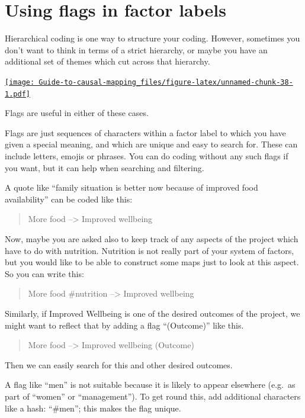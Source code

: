 \documentclass[
]{book}
\begin{document}
\hypertarget{using-flags-in-factor-labels}{%
\section{Using flags in factor labels}\label{using-flags-in-factor-labels}}

Hierarchical coding is one way to structure your coding. However, sometimes you don't want to think in terms of a strict hierarchy, or maybe you have an additional set of themes which cut across that hierarchy.

\href{https://player.vimeo.com/video/671894620}{\texttt{[image: Guide-to-causal-mapping\_files/figure-latex/unnamed-chunk-38-1.pdf]}}

Flags are useful in either of these cases.

Flags are just sequences of characters within a factor label to which you have given a special meaning, and which are unique and easy to search for. These can include letters, emojis or phrases. You can do coding without any such flags if you want, but it can help when searching and filtering.

A quote like ``family situation is better now because of improved food availability'' can be coded like this:

\begin{quote}
More food --\textgreater{} Improved wellbeing
\end{quote}

Now, maybe you are asked also to keep track of any aspects of the project which have to do with nutrition. Nutrition is not really part of your system of factors, but you would like to be able to construct some maps just to look at this aspect. So you can write this:

\begin{quote}
More food \#nutrition --\textgreater{} Improved wellbeing
\end{quote}

Similarly, if Improved Wellbeing is one of the desired outcomes of the project, we might want to reflect that by adding a flag ``(Outcome)'' like this.

\begin{quote}
More food --\textgreater{} Improved wellbeing (Outcome)
\end{quote}

Then we can easily search for this and other desired outcomes.

A flag like ``men'' is not suitable because it is likely to appear elsewhere (e.g.~as part of ``women'' or ``management''). To get round this, add additional characters like a hash: ``\#men''; this makes the flag unique.
\end{document}
